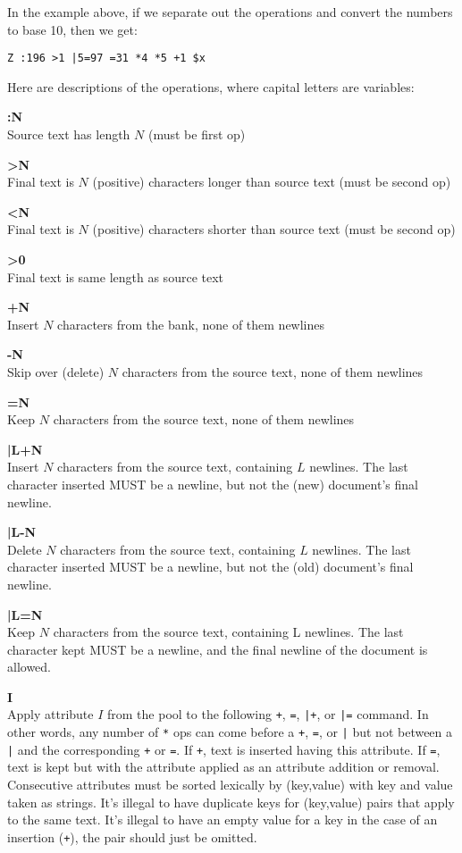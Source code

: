 \documentclass[12pt]{article}
\begin{document}
In the example above, if we separate out the operations
and convert the numbers to base 10, then we get:
\begin{verbatim}
Z :196 >1 |5=97 =31 *4 *5 +1 $x
\end{verbatim}
Here are descriptions of the operations, where capital
letters are variables:

\begin{description}
\item{{\bf :N}} \quad \\
Source text has length $N$ (must be first op)
\item{{\bf >N}} \quad \\
Final text is $N$ (positive) characters longer than source
text (must be second op)
\item{{\bf <N }} \quad \\
Final text is $N$ (positive) characters shorter than
source text (must be second op)
\item{{\bf >0 }} \quad \\
Final text is same length as source text
\item{{\bf +N }} \quad \\
Insert $N$ characters from the bank, none of them newlines
\item{{\bf -N}} \quad \\
Skip over (delete) $N$ characters from the source text,
none of them newlines
\item{{\bf =N}} \quad \\
Keep $N$ characters from the source text, none of them newlines
\item{{\bf |L+N}} \quad \\
Insert $N$ characters from the source text, containing $L$
newlines.  The last character inserted MUST be a newline,
but not the (new) document's final newline.
\item{{\bf |L-N}}  \quad \\
Delete $N$ characters from the source text, containing $L$
newlines. The last character inserted MUST be a newline,
but not the (old) document's final newline.
\item{{\bf |L=N}}  \quad \\
Keep $N$ characters from the source text, containing L
newlines.  The last character kept MUST be a newline, and
the final newline of the document is allowed.
\item{{\bf *I}} \quad \\
Apply attribute $I$ from the pool to the following
\verb|+|, \verb|=|, \verb_|+_, or \verb_|=_ command. In
other words, any number of \verb|*| ops can come before a
\verb_+_, \verb_=_, or \verb_|_ but not between a \verb_|_
and the corresponding \verb_+_ or \verb_=_. If \verb_+_,
text is inserted having this attribute.  If \verb_=_, text
is kept but with the attribute applied as an attribute
addition or removal. Consecutive attributes must be sorted
lexically by (key,value) with key and value taken as
strings.  It's illegal to have duplicate keys for
(key,value) pairs that apply to the same text.  It's
illegal to have an empty value for a key in the case of an
insertion (\verb_+_), the pair should just be omitted.
\end{description}
\end{document}
